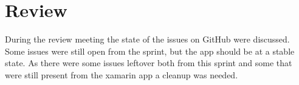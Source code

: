 \section{Review}
During the review meeting the state of the issues on GitHub were discussed.
Some issues were still open from the sprint, but the app should be at a stable state.
As there were some issues leftover both from this sprint and some that were still present from the xamarin app a cleanup was needed.
